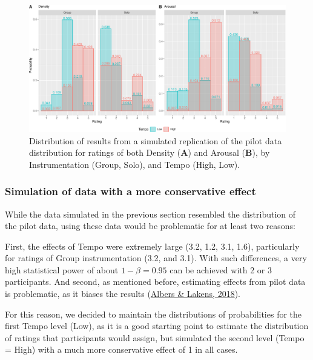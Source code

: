 \documentclass[
  bookmarksnumbered]{article}
\begin{document}
\begin{figure}
\centering
\includegraphics{Power_analysis_files/figure-latex/pilot-rep-1.pdf}
\caption{\label{fig:pilot-rep}Distribution of results from a simulated replication of the pilot data distribution for ratings of both Density (\textbf{A}) and Arousal (\textbf{B}), by Instrumentation (Group, Solo), and Tempo (High, Low).}
\end{figure}

\hypertarget{simulation-of-data-with-a-more-conservative-effect}{%
\subsubsection{Simulation of data with a more conservative effect}\label{simulation-of-data-with-a-more-conservative-effect}}

While the data simulated in the previous section resembled the distribution of the pilot data, using these data would be problematic for at least two reasons:

First, the effects of Tempo were extremely large (3.2, 1.2, 3.1, 1.6), particularly for ratings of Group instrumentation (3.2, and 3.1). With such differences, a very high statistical power of about \(1 - \beta = 0.95\) can be achieved with 2 or 3 participants. And second, as mentioned before, estimating effects from pilot data is problematic, as it biases the results (\protect\hyperlink{ref-albersWhenPowerAnalyses2018}{Albers \& Lakens, 2018}).

For this reason, we decided to maintain the distributions of probabilities for the first Tempo level (Low), as it is a good starting point to estimate the distribution of ratings that participants would assign, but simulated the second level (Tempo = High) with a much more conservative effect of 1 in all cases.
\end{document}
